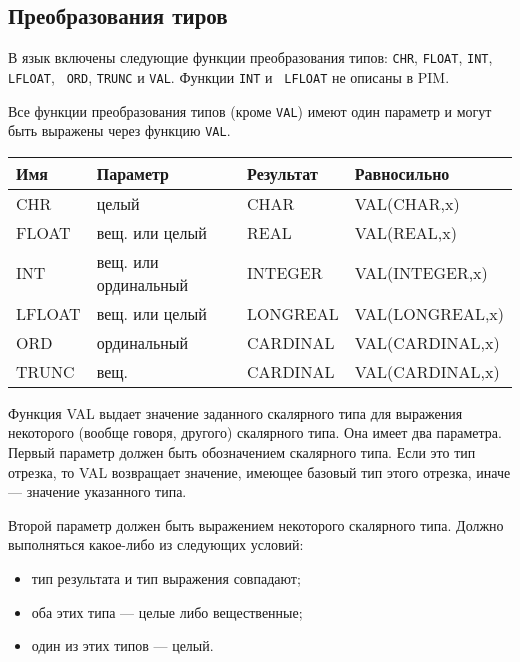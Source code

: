 \subsection{Преобразования тиров}\label{m2:ISO:conv}

В язык включены следующие функции преобразования типов:
{\tt CHR}, {\tt FLOAT}, {\tt INT}, {\tt LFLOAT}, {\tt
ORD}, {\tt TRUNC} и {\tt VAL}. Функции {\tt INT} и {\tt
LFLOAT} не описаны в PIM.

Все функции преобразования типов (кроме {\tt VAL}) 
имеют один параметр и могут быть выражены через функцию {\tt VAL}.
\begin{center}
\begin{tabular}{|l|l|l|l|} \hline
\bf Имя & \bf Параметр & \bf Результат & \bf Равносильно \\ \hline
CHR      & целый           & CHAR       & VAL(CHAR,x)     \\
FLOAT    & вещ. или целый  & REAL       & VAL(REAL,x)     \\
INT      & вещ. или ординальный & INTEGER    & VAL(INTEGER,x)  \\
LFLOAT   & вещ. или целый  & LONGREAL   & VAL(LONGREAL,x) \\
ORD      & ординальный     & CARDINAL   & VAL(CARDINAL,x) \\
TRUNC    & вещ.            & CARDINAL   & VAL(CARDINAL,x) \\ \hline
\end{tabular}
\end{center}

Функция VAL выдает значение заданного скалярного типа для
выражения некоторого (вообще говоря, другого) скалярного типа.
Она имеет два параметра. Первый параметр должен быть обозначением
скалярного типа. Если это тип отрезка, то VAL возвращает значение,
имеющее базовый тип этого отрезка, иначе --- значение указанного типа.

Второй параметр должен быть выражением некоторого скалярного типа.
Должно выполняться какое-либо из следующих условий:
\begin{itemize}
\item тип результата и тип выражения совпадают;
\item оба этих типа --- целые либо вещественные;
\item один из этих типов --- целый.
\end{itemize}

